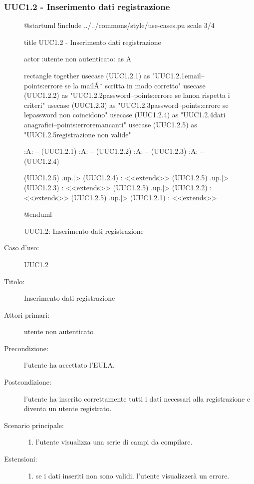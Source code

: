 \documentclass[casi-duso]{subfiles}
\begin{document}
\subsubsection{UUC1.2 - Inserimento dati registrazione}%
\label{subsub:UUC1.2utente}

\begin{figure}[h!] 
  \centering 
  \begin{plantuml}
  @startuml
  !include ../../commons/style/use-cases.pu
  scale 3/4
    
  title UUC1.2 - Inserimento dati registrazione
    
  actor :utente non autenticato: as A
    
  rectangle {
    together {
      usecase (UUC1.2.1) as "UUC1.2.1\nRegistrazione email\n--\nExtension points:\nVisualizzazione errore se la mail\nnon Ã¨ scritta in modo corretto"
      usecase (UUC1.2.2) as "UUC1.2.2\nRegistrazione password\n--\nExtension points:\nVisualizzazione errore se la\npassword non rispetta i criteri" 
      usecase (UUC1.2.3) as "UUC1.2.3\nConferma password\n--\nExtension points:\nVisualizzazione errore se le\ndue password non coincidono"     
      usecase (UUC1.2.4) as "UUC1.2.4\nInserimento dati anagrafici\n--\nExtension points:\nVisualizzazione errore\ndati mancanti" 
      usecase (UUC1.2.5) as "UUC1.2.5\nInformazioni registrazione non valide"
    }
  }
    
  :A: -- (UUC1.2.1)
  :A: -- (UUC1.2.2)
  :A: -- (UUC1.2.3)
  :A: -- (UUC1.2.4)
    
  (UUC1.2.5) .up.|> (UUC1.2.4) : <<extends>>
  (UUC1.2.5) .up.|> (UUC1.2.3) : <<extends>>
  (UUC1.2.5) .up.|> (UUC1.2.2) : <<extends>>
  (UUC1.2.5) .up.|> (UUC1.2.1) : <<extends>>
    
  @enduml  
  \end{plantuml} 
  \caption{UUC1.2: Inserimento dati registrazione} 
  \label{fig:uuc1_2} 
\end{figure}

\begin{description}
  \item[Caso d’uso:] UUC1.2
  \item[Titolo:] Inserimento dati registrazione
  \item[Attori primari:] utente non autenticato
  \item[Precondizione:] l'utente ha accettato l'EULA.
  \item[Postcondizione:] l'utente ha inserito correttamente tutti i dati necessari alla registrazione e diventa un utente registrato.
  \item[Scenario principale:]
        \begin{enumerate}
          \item l'utente visualizza una serie di campi da compilare.
        \end{enumerate}
  \item[Estensioni:]
        \begin{enumerate}
          \item se i dati inseriti non sono validi, l'utente visualizzerà un errore.
        \end{enumerate}
\end{description}
\end{document}
